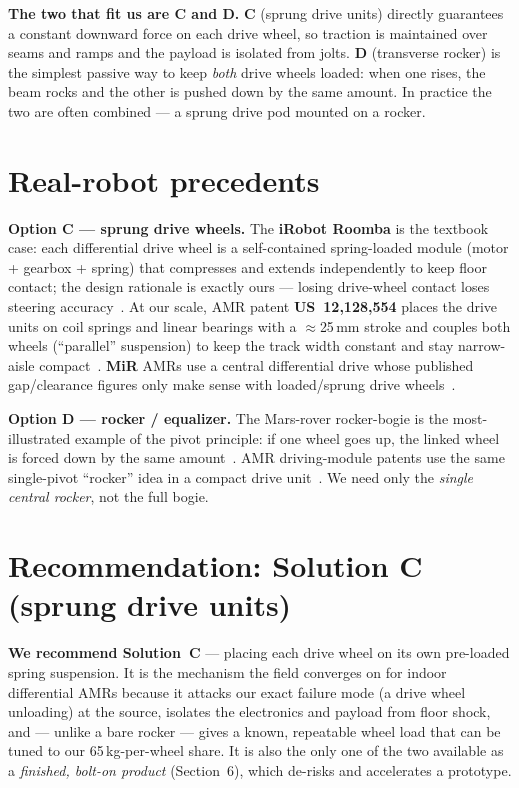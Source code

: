 \documentclass[11pt,a4paper]{article}
\begin{document}
\noindent\textbf{The two that fit us are C and D.}
\textbf{C} (sprung drive units) directly guarantees a constant downward force on each drive wheel, so
traction is maintained over seams and ramps and the payload is isolated from jolts. \textbf{D}
(transverse rocker) is the simplest passive way to keep \emph{both} drive wheels loaded: when one
rises, the beam rocks and the other is pushed down by the same amount. In practice the two are often
combined --- a sprung drive pod mounted on a rocker.

\section{Real-robot precedents}
\textbf{Option C --- sprung drive wheels.}
The \textbf{iRobot Roomba} is the textbook case: each differential drive wheel is a self-contained
spring-loaded module (motor + gearbox + spring) that compresses and extends independently to keep
floor contact; the design rationale is exactly ours --- losing drive-wheel contact loses steering
accuracy~\cite{ifixit,sevarg}. At our scale, AMR patent \textbf{US~12,128,554} places the drive units
on coil springs and linear bearings with a $\approx$25\,mm stroke and couples both wheels (``parallel''
suspension) to keep the track width constant and stay narrow-aisle compact~\cite{patentC}.
\textbf{MiR} AMRs use a central differential drive whose published gap/clearance figures only make
sense with loaded/sprung drive wheels~\cite{mir}.

\textbf{Option D --- rocker / equalizer.}
The Mars-rover rocker-bogie is the most-illustrated example of the pivot principle: if one wheel goes
up, the linked wheel is forced down by the same amount~\cite{planetary}. AMR driving-module patents use
the same single-pivot ``rocker'' idea in a compact drive unit~\cite{patentD}. We need only the
\emph{single central rocker}, not the full bogie.

\section{Recommendation: Solution C (sprung drive units)}
\textbf{We recommend Solution~C} --- placing each drive wheel on its own pre-loaded spring suspension.
It is the mechanism the field converges on for indoor differential AMRs because it attacks our exact
failure mode (a drive wheel unloading) at the source, isolates the electronics and payload from floor
shock, and --- unlike a bare rocker --- gives a known, repeatable wheel load that can be tuned to our
65\,kg-per-wheel share. It is also the only one of the two available as a \emph{finished, bolt-on
product} (Section~6), which de-risks and accelerates a prototype.
\end{document}
